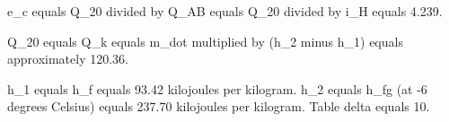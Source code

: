e_c equals Q_20 divided by Q_AB equals Q_20 divided by i_H equals 4.239.  

Q_20 equals Q_k equals m_dot multiplied by (h_2 minus h_1) equals approximately 120.36.  

h_1 equals h_f equals 93.42 kilojoules per kilogram.  
h_2 equals h_fg (at -6 degrees Celsius) equals 237.70 kilojoules per kilogram.  
Table delta equals 10.